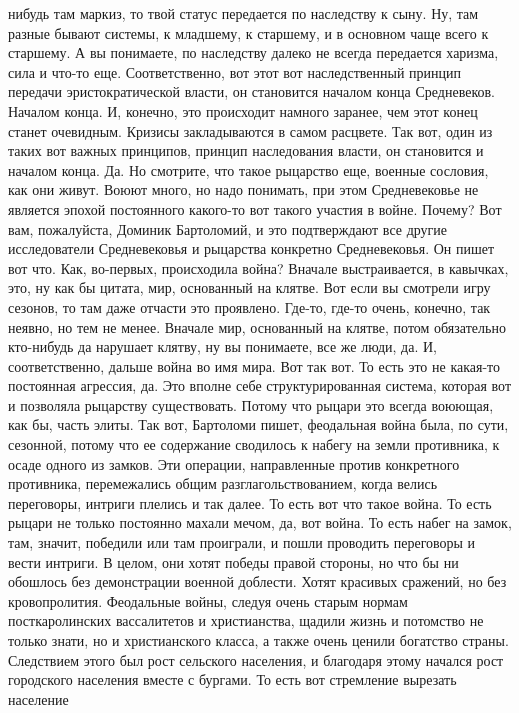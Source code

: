нибудь там маркиз, то твой статус передается по наследству к сыну. Ну, там
разные бывают системы, к младшему, к старшему, и в основном чаще всего к
старшему. А вы понимаете, по наследству далеко не всегда передается харизма,
сила и что-то еще. Соответственно, вот этот вот наследственный принцип передачи
эристократической власти, он становится началом конца Средневеков. Началом
конца. И, конечно, это происходит намного заранее, чем этот конец станет
очевидным. Кризисы закладываются в самом расцвете. Так вот, один из таких вот
важных принципов, принцип наследования власти, он становится и началом конца.
Да. Но смотрите, что такое рыцарство еще, военные сословия, как они живут. Воюют
много, но надо понимать, при этом Средневековье не является эпохой постоянного
какого-то вот такого участия в войне. Почему? Вот вам, пожалуйста, Доминик
Бартоломий, и это подтверждают все другие исследователи Средневековья и
рыцарства конкретно Средневековья. Он пишет вот что. Как, во-первых, происходила
война? Вначале выстраивается, в кавычках, это, ну как бы цитата, мир, основанный
на клятве. Вот если вы смотрели игру сезонов, то там даже отчасти это проявлено.
Где-то, где-то очень, конечно, так неявно, но тем не менее. Вначале мир,
основанный на клятве, потом обязательно кто-нибудь да нарушает клятву, ну вы
понимаете, все же люди, да. И, соответственно, дальше война во имя мира. Вот так
вот. То есть это не какая-то постоянная агрессия, да. Это вполне себе
структурированная система, которая вот и позволяла рыцарству существовать.
Потому что рыцари это всегда воюющая, как бы, часть элиты. Так вот, Бартоломи
пишет, феодальная война была, по сути, сезонной, потому что ее содержание
сводилось к набегу на земли противника, к осаде одного из замков. Эти операции,
направленные против конкретного противника, перемежались общим
разглагольствованием, когда велись переговоры, интриги плелись и так далее. То
есть вот что такое война. То есть рыцари не только постоянно махали мечом, да,
вот война. То есть набег на замок, там, значит, победили или там проиграли, и
пошли проводить переговоры и вести интриги. В целом, они хотят победы правой
стороны, но что бы ни обошлось без демонстрации военной доблести. Хотят красивых
сражений, но без кровопролития. Феодальные войны, следуя очень старым нормам
посткаролинских вассалитетов и христианства, щадили жизнь и потомство не только
знати, но и христианского класса, а также очень ценили богатство страны.
Следствием этого был рост сельского населения, и благодаря этому начался рост
городского населения вместе с бургами. То есть вот стремление вырезать население

